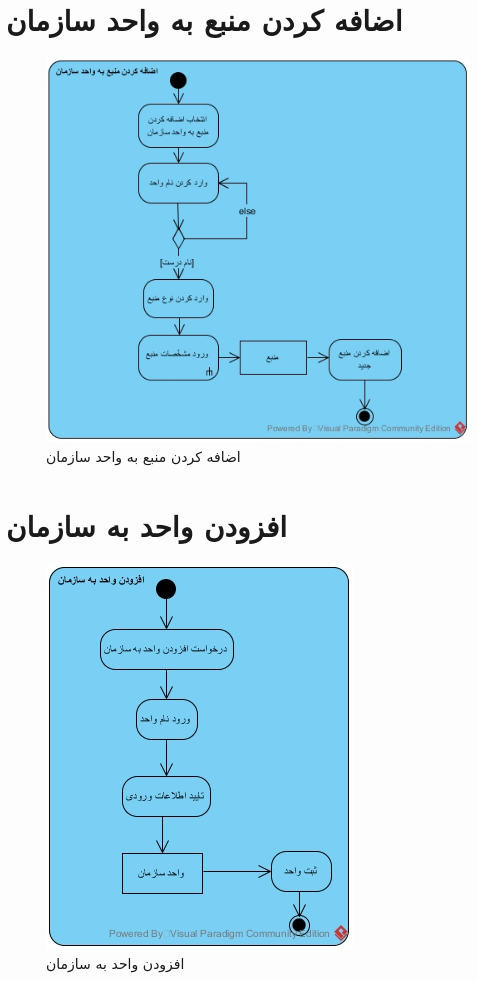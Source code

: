 \section{اضافه کردن منبع به واحد سازمان}
\begin{figure}[H]
	\centering
	\includegraphics[scale=0.8]{img/activity/addresunit}
	\caption{اضافه کردن منبع به واحد سازمان}
\end{figure}

\section{افزودن واحد به سازمان}
\begin{figure}[H]
	\centering
	\includegraphics[scale=0.8]{img/activity/addunit}
	\caption{افزودن واحد به سازمان}
\end{figure}


